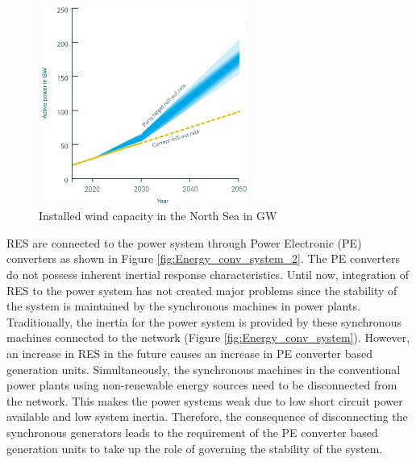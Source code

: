 \begin{figure}[H]
\centering
    \includegraphics[height = 6.5cm,width = 7cm]{Diagrams/Chapter_1/Paris.pdf}
    \caption{Installed wind capacity in the North Sea in GW \cite{noauthor_vision_nodate}}
    \label{fig:Paris_roll_out}
\end{figure}

\gls{RES} are connected to the power system through Power Electronic (\gls{PE}) converters as shown in Figure \ref{fig:Energy_conv_system_2}. The \gls{PE} converters do not possess inherent inertial response characteristics. Until now, integration of \gls{RES} to the power system has not created major problems since the stability of the system is maintained by the synchronous machines in power plants. Traditionally, the inertia for the power system is provided by these synchronous machines connected to the network (Figure \ref{fig:Energy_conv_system}). However, an increase in \gls{RES} in the future causes an increase in \gls{PE} converter based generation units. Simultaneously, the synchronous machines in the conventional power plants using non-renewable energy sources need to be disconnected from the network. This makes the power systems weak due to low short circuit power available and low system inertia. Therefore, the consequence of disconnecting the synchronous generators leads to the requirement of the \gls{PE} converter based generation units to take up the role of governing the stability of the system.

